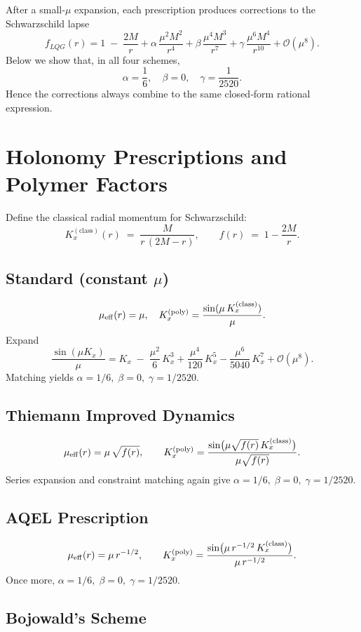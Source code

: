 \documentclass[11pt]{article}
\begin{document}
After a small‐$\mu$ expansion, each prescription produces corrections to the Schwarzschild lapse
\[
f_{LQG}(r) 
= 1 \;-\; \frac{2M}{r}
+ \alpha\,\frac{\mu^{2}M^{2}}{r^{4}}
+ \beta\,\frac{\mu^{4}M^{3}}{r^{7}}
+ \gamma\,\frac{\mu^{6}M^{4}}{r^{10}}
+ \mathcal{O}(\mu^{8}).
\]
Below we show that, in all four schemes, 
\[
\alpha = \frac{1}{6}, \quad \beta = 0, \quad \gamma = \frac{1}{2520}.
\]
Hence the corrections always combine to the same closed‐form rational expression.

\section{Holonomy Prescriptions and Polymer Factors}

Define the classical radial momentum for Schwarzschild:
\[
K_x^{(\text{class})}(r) \;=\; \frac{M}{r\,(2M - r)},
\qquad
f(r) \;=\; 1 - \frac{2M}{r}.
\]

\subsection{Standard (constant $\mu$)}

\[
\mu_{\rm eff}(r) = \mu, 
\quad
K_x^{(\text{poly})} = \frac{\sin(\mu\,K_x^{(\text{class})})}{\mu}.
\]
Expand
\[
\frac{\sin(\mu K_x)}{\mu} 
= K_x \;-\; \frac{\mu^2}{6}\,K_x^3 
  + \frac{\mu^4}{120}\,K_x^5 
  - \frac{\mu^6}{5040}\,K_x^7 + \mathcal{O}(\mu^8).
\]
Matching yields \(\alpha=1/6,\;\beta=0,\;\gamma=1/2520.\)

\subsection{Thiemann Improved Dynamics~\cite{Thiemann1996}}

\[
\mu_{\rm eff}(r) = \mu\,\sqrt{f(r)}, 
\qquad
K_x^{(\text{poly})} = \frac{\sin\bigl(\mu \sqrt{f(r)}\,K_x^{(\text{class})}\bigr)}{\mu \sqrt{f(r)}}.
\]
Series expansion and constraint matching again give
\(\alpha=1/6,\;\beta=0,\;\gamma=1/2520.\)

\subsection{AQEL Prescription~\cite{AQEL2008}}

\[
\mu_{\rm eff}(r) = \mu\,r^{-1/2}, 
\qquad
K_x^{(\text{poly})} = \frac{\sin\bigl(\mu\,r^{-1/2}\,K_x^{(\text{class})}\bigr)}{\mu\,r^{-1/2}}.
\]
Once more, 
\(\alpha=1/6,\;\beta=0,\;\gamma=1/2520.\)

\subsection{Bojowald's Scheme~\cite{Bojowald2005}}
\end{document}
